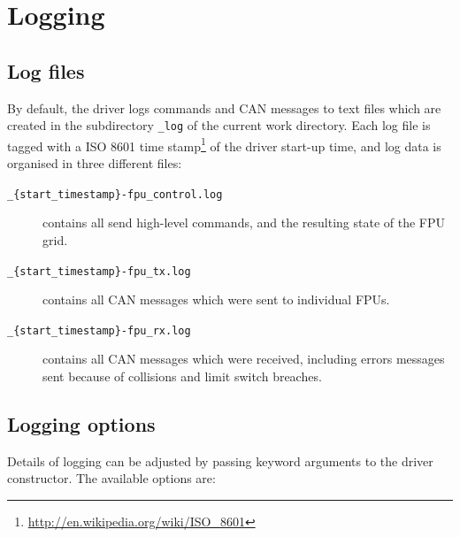 \documentclass[11pt,a4paper]{scrartcl}
\begin{document}
\section{Logging}
\label{sec:logging}
\subsection{Log files}

By default, the driver logs commands and CAN messages to text files
which are created in the subdirectory \texttt{\_log} of the current
work directory. Each log file is tagged with a ISO 8601 time
stamp\footnote{\url{http://en.wikipedia.org/wiki/ISO\_8601}} of the
driver start-up time, and log data is organised in three different
files:

\begin{description}
\item[\texttt{\_\{start\_timestamp\}-fpu\_control.log}] contains all
  send high-level commands, and the resulting state of the FPU grid.
  
\item[\texttt{\_\{start\_timestamp\}-fpu\_tx.log}] contains all CAN messages which were sent to individual FPUs.
\item[\texttt{\_\{start\_timestamp\}-fpu\_rx.log}] contains all CAN
  messages which were received, including errors messages sent because
  of collisions and limit switch breaches.
  
\end{description}


\subsection{Logging options}
Details of logging can be adjusted by passing keyword
arguments to the driver constructor. The available options are:
\end{document}
